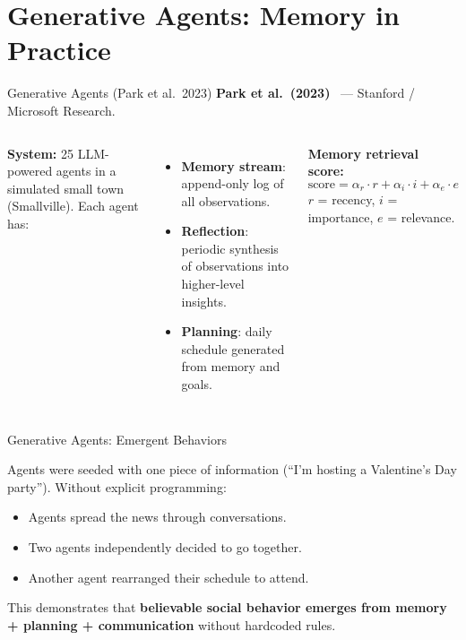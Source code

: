 \documentclass[aspectratio=169,10pt]{beamer}
\begin{document}
\section{Generative Agents: Memory in Practice}

\begin{frame}{Generative Agents (Park et al.\ 2023)}
  \textbf{Park et al.\ (2023)}~\cite{park2023generative} — Stanford / Microsoft Research.
  \vspace{0.4em}
  \begin{columns}[T]
      \textbf{System:} 25 LLM-powered agents in a simulated small town (Smallville).
      Each agent has:
      \begin{itemize}
        \item \textbf{Memory stream}: append-only log of all observations.
        \item \textbf{Reflection}: periodic synthesis of observations into higher-level insights.
        \item \textbf{Planning}: daily schedule generated from memory and goals.
      \end{itemize}
      \vspace{0.3em}
      \textbf{Memory retrieval score:}
      \[
        \text{score} = \alpha_r \cdot r + \alpha_i \cdot i + \alpha_e \cdot e
      \]
      $r$ = recency, $i$ = importance, $e$ = relevance.
  \end{columns}
\end{frame}

\begin{frame}{Generative Agents: Emergent Behaviors}
  \begin{tcolorbox}[hitbox, title=Emergent Social Behaviors]
    Agents were seeded with one piece of information (``I'm hosting a Valentine's Day party'').
    Without explicit programming:
    \begin{itemize}
      \item Agents spread the news through conversations.
      \item Two agents independently decided to go together.
      \item Another agent rearranged their schedule to attend.
    \end{itemize}
  \end{tcolorbox}
  \vspace{0.4em}
  This demonstrates that \textbf{believable social behavior emerges from memory + planning + communication} without hardcoded rules.
\end{frame}
\end{document}
